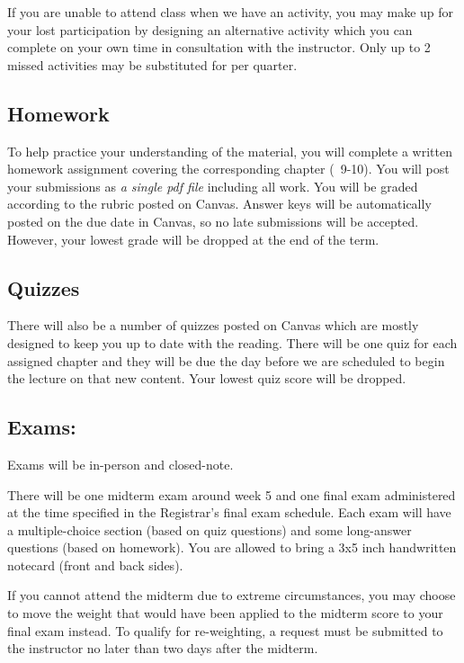   If you are unable to attend class when we have an activity, you may make up for your lost participation by designing an alternative activity which you can complete on your own time in consultation with the instructor.
  Only up to 2 missed activities may be substituted for per quarter.

  \hypertarget{grade:HW}{\subsection{Homework}}

  To help practice your understanding of the material, you will complete a written homework assignment covering the corresponding chapter (~9-10).
  You will post your submissions as \textit{a single pdf file} including all work. You will be graded according to the rubric posted on Canvas. 
  Answer keys will be automatically posted on the due date in Canvas, so no late submissions will be accepted.
  However, your lowest grade will be dropped at the end of the term.

  \hypertarget{grade:quiz}{\subsection{Quizzes}}

  There will also be a number of quizzes posted on Canvas which are mostly designed to keep you up to date with the reading.
  There will be one quiz for each assigned chapter and they will be due the day before we are scheduled to begin the lecture on that new content.
  Your lowest quiz score will be dropped.
 
  \hypertarget{grade:exam}{\subsection{Exams:}}

  Exams will be in-person and closed-note.

  There will be one midterm exam around week 5 and one final exam administered at the time specified in the Registrar’s final exam schedule.
  Each exam will have a multiple-choice section (based on quiz questions) and some long-answer questions (based on homework).
  You are allowed to bring a 3x5 inch handwritten notecard (front and back sides).

  If you cannot attend the midterm due to extreme circumstances, you may choose to move the weight that would have been applied to the midterm score to your final exam instead.
  To qualify for re-weighting, a request must be submitted to the instructor no later than two days after the midterm.


